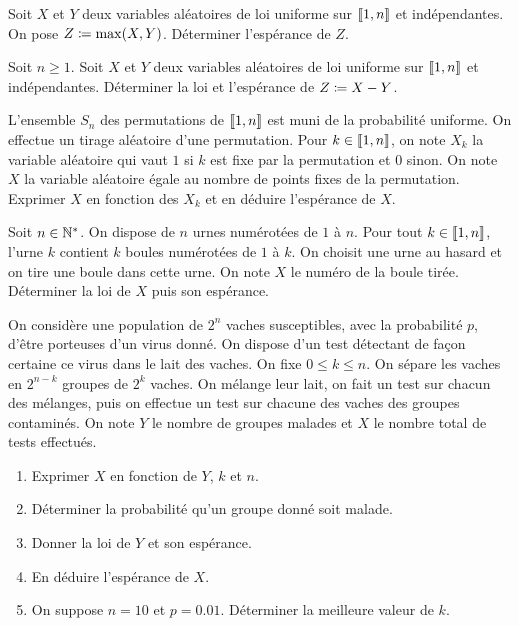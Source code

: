 \documentclass{magnolia}
\begin{document}

Soit $X$ et $Y$ deux variables aléatoires de loi uniforme sur $\left\llbracket 1,n\right\rrbracket$ et indépendantes. On pose $Z \coloneqq \max (X, Y)$. Déterminer l'espérance de $Z$.

Soit $n \geq 1$. Soit $X$ et $Y$ deux variables aléatoires de loi uniforme sur $\left\llbracket 1,n\right\rrbracket$ et indépendantes.
Déterminer la loi et l'espérance de $Z\coloneqq X-Y$.

L'ensemble $S_n$ des permutations de $\left\llbracket 1,n\right\rrbracket$ est muni de la probabilité uniforme.
On effectue un tirage aléatoire d'une permutation. Pour $k \in \left\llbracket 1,n\right\rrbracket$, on note $X_k$ la variable aléatoire qui vaut $1$ si $k$ est fixe par la permutation et $0$ sinon.
On note $X$ la variable aléatoire égale au nombre de points fixes de la permutation.
Exprimer $X$ en fonction des $X_k$ et en déduire l'espérance de $X$.

Soit $n \in \mathbb{N} ^*$. On dispose de $n$ urnes numérotées de $1$ à $n$. Pour tout
$k\in\left\llbracket 1,n\right\rrbracket$, l'urne $k$ contient $k$ boules numérotées de $1$ à $k$. On choisit une
urne au hasard et on tire une boule dans cette urne. On note $X$ le numéro de la boule tirée.
Déterminer la loi de $X$ puis son espérance.

On considère une population de $2^n$ vaches susceptibles, avec la probabilité $p$, d'être porteuses d'un virus donné.
On dispose d'un test détectant de façon certaine ce virus dans le lait des vaches.
On fixe $0 \leq k \leq n$. On sépare les vaches en $2^{n-k}$ groupes de $2^k$ vaches. On mélange leur lait, on fait un test sur chacun des mélanges, puis on effectue un test sur chacune des vaches des groupes contaminés.
On note $Y$ le nombre de groupes malades et $X$ le nombre total de tests effectués.
\begin{enumerate}
\item Exprimer $X$ en fonction de $Y$, $k$ et $n$.
\item Déterminer la probabilité qu'un groupe donné soit malade.
\item Donner la loi de $Y$ et son espérance.
\item En déduire l'espérance de $X$.
\item On suppose $n=10$ et $p=0.01$. Déterminer la meilleure valeur de $k$.
\end{enumerate}
\end{document}
